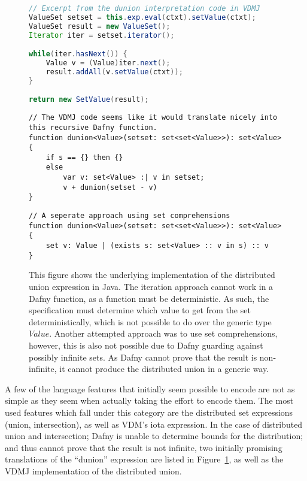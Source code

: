 \documentclass{entcs}
\begin{document}
\begin{figure}[h]
	\begin{center}
        \begin{lstlisting}[language=Java]
// Excerpt from the dunion interpretation code in VDMJ
ValueSet setset = this.exp.eval(ctxt).setValue(ctxt);
ValueSet result = new ValueSet();
Iterator iter = setset.iterator();

while(iter.hasNext()) {
    Value v = (Value)iter.next();
    result.addAll(v.setValue(ctxt));
}

return new SetValue(result);
        \end{lstlisting}
        \begin{lstlisting}[language=Dafny]
// The VDMJ code seems like it would translate nicely into this recursive Dafny function.
function dunion<Value>(setset: set<set<Value>>): set<Value> {
    if s == {} then {} 
    else 
        var v: set<Value> :| v in setset;
        v + dunion(setset - v)
}
        \end{lstlisting}
        \begin{lstlisting}[language=Dafny]
// A seperate approach using set comprehensions
function dunion<Value>(setset: set<set<Value>>): set<Value> {
    set v: Value | (exists s: set<Value> :: v in s) :: v
}
        \end{lstlisting}
		\caption{This figure shows the underlying implementation of the distributed union expression in Java. The iteration approach cannot work in a Dafny function, as a function must be deterministic. As such, the specification must determine which value to get from the set deterministically, which is not possible to do over the generic type $Value$. Another attempted approach was to use set comprehensions, however, this is also not possible due to Dafny guarding against possibly infinite sets. As Dafny cannot prove that the result is non-infinite, it cannot produce the distributed union in a generic way.}\label{fig:java_dunion}
	\end{center}
\end{figure}

A few of the language features that initially seem possible to encode are not as simple as they seem when actually taking the effort to encode them. The most used features which fall under this category are the distributed set expressions (union, intersection), as well as VDM's iota expression. In the case of distributed union and intersection; Dafny is unable to determine bounds for the distribution; and thus cannot prove that the result is not infinite, two initially promising translations of the ``dunion'' expression are listed in Figure~\ref{fig:java_dunion}, as well as the VDMJ implementation of the distributed union.
\end{document}
